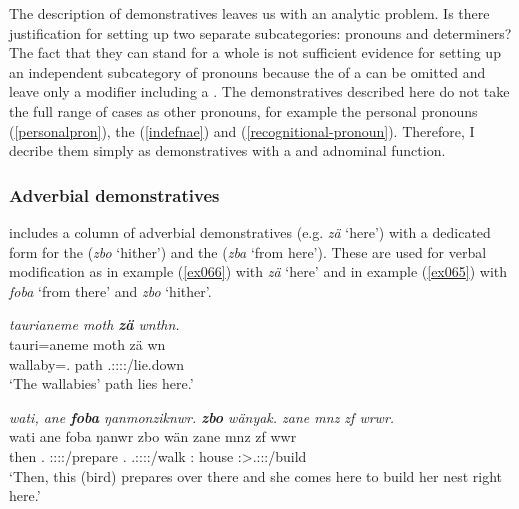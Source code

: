 The description of demonstratives leaves us with an analytic problem. Is there justification for setting up two separate subcategories:  pronouns and  determiners? The fact that they can stand for a whole  is not sufficient evidence for setting up an independent subcategory of  pronouns because the  of a  can be omitted and leave only a modifier including a  . The demonstratives described here do not take the full range of cases as other pronouns, for example the personal pronouns (\ref{personalpron}), the  (\ref{indefnae}) and   (\ref{recognitional-pronoun}). Therefore, I decribe them simply as demonstratives with a  and adnominal function.

\subsubsection{Adverbial demonstratives} \label{demadv}

 includes a column of adverbial demonstratives (e.g. \emph{zä} `here') with a dedicated form for the  (\emph{zbo} `hither') and the   (\emph{zba} `from here'). These are used for verbal modification as in example (\ref{ex066}) with \emph{zä} `here' and in example (\ref{ex065}) with \emph{foba} `from there' and \emph{zbo} `hither'.

\begin{exe}
	\ex \emph{taurianeme moth \textbf{zä} wnthn.}\\
	\gll tauri=aneme moth zä wn\\
	wallaby=\Poss.\Nsg{} path \Prox{} \Tsg.\F:\Sbj:\Nonpast:\Ipfv:\Venit/lie.down\\
	\trans `The wallabies' path lies here.' 
	\label{ex066}
\end{exe}
\begin{exe}
	\ex \emph{wati, ane \textbf{foba} ŋanmonziknwr. \textbf{zbo} wänyak. zane mnz zf wrwr.}\\
	\gll wati ane foba ŋanwr zbo wän zane mnz zf wwr\\
	then \Dem{} \Dist.\Abl{} \Stsg:\Sbj:\Nonpast:\Ipfv:\Venit/prepare \Prox.\All{} \Tsg.\F:\Sbj:\Nonpast:\Ipfv:\Venit/walk \Dem:\Prox{} house \Imm{} \Stsg:\Sbj>\Tsg.\F:\Obj:\Nonpast:\Ipfv/build\\
	\trans `Then, this (bird) prepares over there and she comes here to build her nest right here.' 
	\label{ex065}
\end{exe}

